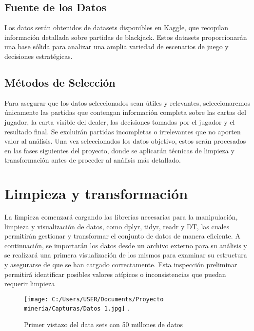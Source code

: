 \documentclass[conference,final,]{IEEEtran}
\begin{document}
\subsection{Fuente de los Datos}\label{fuente-de-los-datos}

Los datos serán obtenidos de datasets disponibles en Kaggle, que
recopilan información detallada sobre partidas de blackjack. Estos
datasets proporcionarán una base sólida para analizar una amplia
variedad de escenarios de juego y decisiones estratégicas.

\subsection{Métodos de Selección}\label{muxe9todos-de-selecciuxf3n}

Para asegurar que los datos seleccionados sean útiles y relevantes,
seleccionaremos únicamente las partidas que contengan información
completa sobre las cartas del jugador, la carta visible del dealer, las
decisiones tomadas por el jugador y el resultado final. Se excluirán
partidas incompletas o irrelevantes que no aporten valor al análisis.
Una vez seleccionados los datos objetivo, estos serán procesados en las
fases siguientes del proyecto, donde se aplicarán técnicas de limpieza y
transformación antes de proceder al análisis más detallado.

\section{Limpieza y transformación}\label{limpieza-y-transformaciuxf3n}

La limpieza comenzará cargando las librerías necesarias para la
manipulación, limpieza y visualización de datos, como dplyr, tidyr,
readr y DT, las cuales permitirán gestionar y transformar el conjunto de
datos de manera eficiente. A continuación, se importarán los datos desde
un archivo externo para su análisis y se realizará una primera
visualización de los mismos para examinar su estructura y asegurarse de
que se han cargado correctamente. Esta inspección preliminar permitirá
identificar posibles valores atípicos o inconsistencias que puedan
requerir limpieza

\begin{figure}[htbp]
\centering
\texttt{[image: C:/Users/USER/Documents/Proyecto minería/Capturas/Datos 1.jpg]}
\DeclareGraphicsExtensions.
\caption{Primer vistazo del data sets con 50 millones de datos}
\label{Dataset}
\end{figure}
\end{document}

